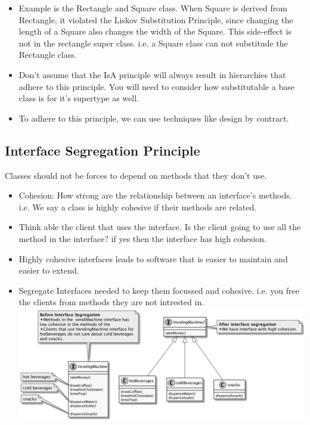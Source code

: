 \documentclass[11pt]{article}
\begin{document}
\begin{itemize}
        \item Example is the Rectangle and Square class. When Square is derived from Rectangle, it violated the Liskov
        Substitution Principle, since changing the length of a Square also changes the width of the Square. This side-effect
        is not in the rectangle super class. i.e. a Square class can not substitude the Rectangle class.
        \item Don't assume that the IsA principle will always result in hierarchies that adhere to this principle. You
        will need to consider how substitutable a base class is for it's supertype as well.
        \item To adhere to this principle, we can use techniques like design by contract.
    \end{itemize}

    \subsection{Interface Segregation Principle}
    Classes should not be forces to depend on methods that they don't use.
    \begin{itemize}
        \item Cohesion: How strong are the relationship between an interface's methods. i.e. We say a class is highly
        cohesive if their methods are related.
        \item Think able the client that uses the interface. Is the client going to use all the method in the interface? if yes
        then the interface has high cohesion.
        \item Highly cohesive interfaces leads to software that is easier to maintain and easier to extend.
        \item Segregate Interfaces needed to keep them focussed and cohesive. i.e. you free the clients from methods they
        are not intrested in. \\
        \includegraphics[scale=0.2]{interface_segregation_principle}
    \end{itemize}
\end{document}
